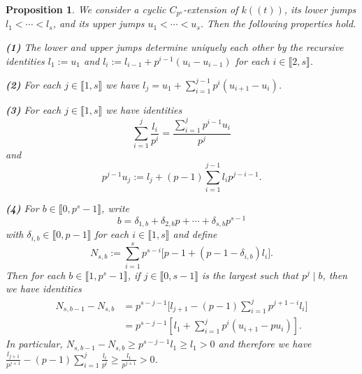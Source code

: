 \documentclass[11pt]{amsart}
\newtheorem{proposition}[theorem]{Proposition}
\begin{document}
\begin{proposition}\label{P3}
We consider a cyclic $C_{p^s}$-extension of $k((t))$, its lower jumps $l_1<\cdots <l_s$, and its upper jumps $u_1<\cdots<u_s$. Then the following properties hold. 

\medskip
{\bf (1)} The lower and upper jumps determine uniquely each other by the recursive identities $l_1:=u_1$ and $l_i:=l_{i-1}+p^{i-1}(u_i-u_{i-1})$ for each $i\in\llbracket2,s\rrbracket$. 

\smallskip
{\bf (2)} For each $j\in\llbracket1,s\rrbracket $ we have $l_j=u_1+\sum_{i=1}^{j-1} p^i(u_{i+1}-u_i)$.

\smallskip
{\bf (3)} For each $j\in\llbracket1,s\rrbracket$ we have identities 
$$\sum_{i=1}^j \frac{l_i}{p^i}=\frac{\sum_{i=1}^j p^{i-1}u_i}{p^j}$$
and
$$p^{j-1}u_j:=l_j+(p-1)\sum_{i=1}^{j-1}l_ip^{j-i-1}.$$

{\bf (4)} For $b\in\llbracket0,p^s-1\rrbracket$, write
\[
b=\delta_{1,b}+\delta_{2,b}p+\cdots+\delta_{s,b}p^{s-1}
\]
with $\delta_{i,b}\in\llbracket0,p-1\rrbracket$ for each $i\in\llbracket1,s\rrbracket$ and define
\[
N_{s,b}:=\sum_{i=1}^s p^{s-i}\bigl[p-1+(p-1-\delta_{i,b})l_i\bigr].
\] Then for each $b\in \llbracket1,p^s-1\rrbracket$, if $j\in\llbracket0,s-1\rrbracket$ is the largest such that $p^j\mid b$, then we have identities 
\begin{equation*}
\begin{aligned}
N_{s,b-1}-N_{s,b}&=p^{s-j-1}\Big[l_{j+1}-(p-1)\sum_{i=1}^j p^{j+1-i}l_i\Big]\\
&=p^{s-j-1}[l_1+\sum_{i=1}^j p^i(u_{i+1}-pu_i)].
\end{aligned}
\end{equation*}
In particular, $N_{s,b-1}-N_{s,b}\ge p^{s-j-1}l_1\ge l_1>0$ and therefore we have $\frac{l_{j+1}}{p^{j+1}}-(p-1)\sum_{i=1}^j\frac{l_i}{p^i}\ge\frac{l_1}{p^{j+1}}>0$.
\end{proposition}
\end{document}
